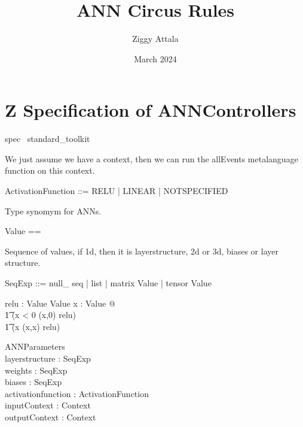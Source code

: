 \documentclass{article}
\title{ANN Circus Rules}
\author{Ziggy Attala}
\date{March 2024}
\begin{document}
\maketitle

\section{Z Specification of ANNControllers}

\begin{zsection}	 \SECTION spec \parents~standard\_toolkit
\end{zsection}


We just assume we have a context, then we can run the allEvents metalanguage function on this context. 
\begin{zed}
\end{zed}

\begin{zed}ActivationFunction ::= RELU | LINEAR | NOTSPECIFIED
\end{zed}


Type synomym for ANNs. 
\begin{zed}
Value == \arithmos
\end{zed}

Sequence of values, if 1d, then it is layerstructure, 2d or 3d, biases or layer structure. 
\begin{zed}
SeqExp ::= null\_ seq | list \ldata \seq \nat \rdata | matrix \ldata \seq \seq Value \rdata | tensor \ldata \seq \seq \seq Value \rdata
\end{zed}


\begin{axdef}
  relu : Value \fun Value %
  \where %
  \forall x : Value @ \\%
  \t1 %
  (x < 0 \implies (x,0) \in relu) \land \\%
  \t1 %
  (x  \implies (x,x) \in relu)
\end{axdef}

\begin{schema}{ANNParameters}
\\
 layerstructure : SeqExp \\
 weights : SeqExp \\
 biases : SeqExp \\
 activationfunction : ActivationFunction \\
 inputContext : Context \\
 outputContext : Context \\
\end{schema}
\end{document}
